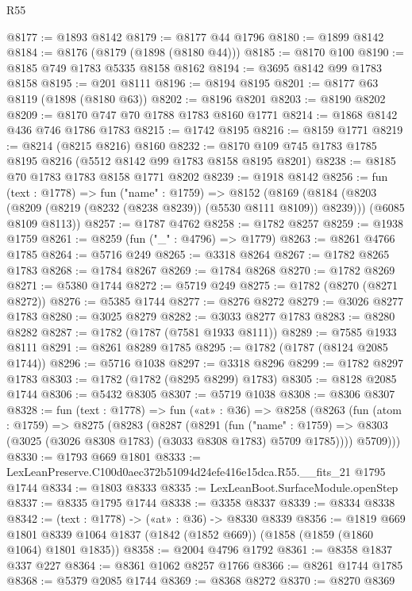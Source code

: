 \begin{lexlean}{R55}
\begin{coremodule}
@8177 := @1893 @8142
@8179 := @8177 @44 @1796
@8180 := @1899 @8142
@8184 := @8176 (@8179 (@1898 (@8180 @44)))
@8185 := @8170 @100
@8190 := @8185 @749 @1783 @5335 @8158 @8162
@8194 := @3695 @8142 @99 @1783 @8158
@8195 := @201 @8111
@8196 := @8194 @8195
@8201 := @8177 @63 @8119 (@1898 (@8180 @63))
@8202 := @8196 @8201
@8203 := @8190 @8202
@8209 := @8170 @747 @70 @1788 @1783 @8160 @1771
@8214 := @1868 @8142 @436 @746 @1786 @1783
@8215 := @1742 @8195
@8216 := @8159 @1771
@8219 := @8214 (@8215 @8216) @8160
@8232 := @8170 @109 @745 @1783 @1785 @8195 @8216 (@5512 @8142 @99 @1783 @8158 @8195 @8201)
@8238 := @8185 @70 @1783 @1783 @8158 @1771 @8202
@8239 := @1918 @8142
@8256 := fun (text : @1778) =>
  fun ("name" : @1759) =>
  @8152
    (@8169
      (@8184 (@8203 (@8209 (@8219 (@8232 (@8238 @8239)) (@5530 @8111 @8109)) @8239)))
      (@6085 @8109 @8113))
@8257 := @1787 @4762
@8258 := @1782 @8257
@8259 := @1938 @1759
@8261 := @8259 (fun ("_" : @4796) => @1779)
@8263 := @8261 @4766 @1785
@8264 := @5716 @249
@8265 := @3318 @8264
@8267 := @1782 @8265 @1783
@8268 := @1784 @8267
@8269 := @1784 @8268
@8270 := @1782 @8269
@8271 := @5380 @1744
@8272 := @5719 @249
@8275 := @1782 (@8270 (@8271 @8272))
@8276 := @5385 @1744
@8277 := @8276 @8272
@8279 := @3026 @8277 @1783
@8280 := @3025 @8279
@8282 := @3033 @8277 @1783
@8283 := @8280 @8282
@8287 := @1782 (@1787 (@7581 @1933 @8111))
@8289 := @7585 @1933 @8111
@8291 := @8261 @8289 @1785
@8295 := @1782 (@1787 (@8124 @2085 @1744))
@8296 := @5716 @1038
@8297 := @3318 @8296
@8299 := @1782 @8297 @1783
@8303 := @1782 (@1782 (@8295 @8299) @1783)
@8305 := @8128 @2085 @1744
@8306 := @5432 @8305
@8307 := @5719 @1038
@8308 := @8306 @8307
@8328 := fun (text : @1778) =>
  fun («at» : @36) =>
  @8258
    (@8263
      (fun (atom : @1759) =>
      @8275
        (@8283
          (@8287
            (@8291
              (fun ("name" : @1759) =>
              @8303 (@3025 (@3026 @8308 @1783) (@3033 @8308 @1783) @5709 @1785))))
          @5709)))
@8330 := @1793 @669 @1801
@8333 := LexLeanPreserve.C100d0aec372b51094d24efe416e15dca.R55.__fits_21 @1795 @1744
@8334 := @1803 @8333
@8335 := LexLeanBoot.SurfaceModule.openStep
@8337 := @8335 @1795 @1744
@8338 := @3358 @8337
@8339 := @8334 @8338
@8342 := (text : @1778) -> («at» : @36) -> @8330 @8339
@8356 := @1819
    @669
    @1801
    @8339
    @1064
    @1837
    (@1842 (@1852 @669))
    (@1858 (@1859 (@1860 @1064) @1801 @1835))
@8358 := @2004 @4796 @1792
@8361 := @8358 @1837 @337 @227
@8364 := @8361 @1062 @8257 @1766
@8366 := @8261 @1744 @1785
@8368 := @5379 @2085 @1744
@8369 := @8368 @8272
@8370 := @8270 @8369

\end{coremodule}
\end{lexlean}
